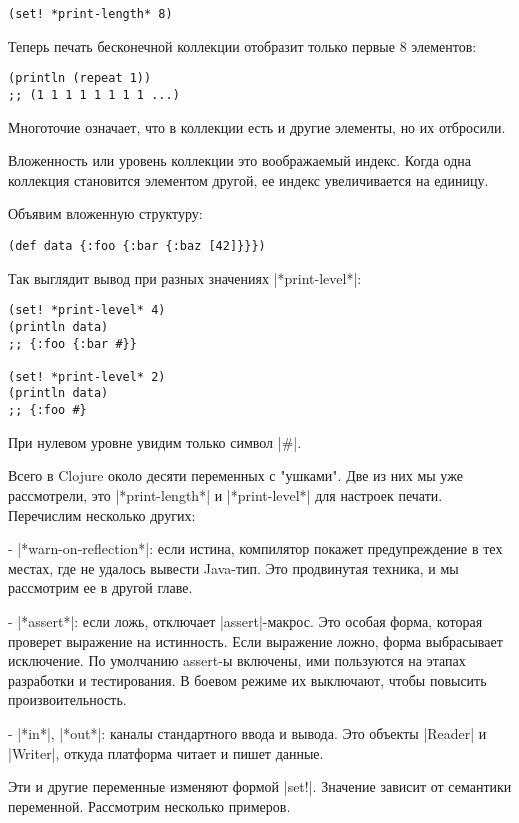 \begin{verbatim}
(set! *print-length* 8)
\end{verbatim}

Теперь печать бесконечной коллекции отобразит только первые 8 элементов:

\begin{verbatim}
(println (repeat 1))
;; (1 1 1 1 1 1 1 1 ...)
\end{verbatim}

Многоточие означает, что в коллекции есть и другие элементы, но их отбросили.

Вложенность или уровень коллекции это воображаемый индекс. Когда одна коллекция
становится элементом другой, ее индекс увеличивается на единицу.

Объявим вложенную структуру:

\begin{verbatim}
(def data {:foo {:bar {:baz [42]}}})
\end{verbatim}

Так выглядит вывод при разных значениях \spverb|*print-level*|:

\begin{verbatim}
(set! *print-level* 4)
(println data)
;; {:foo {:bar #}}

(set! *print-level* 2)
(println data)
;; {:foo #}
\end{verbatim}

При нулевом уровне увидим только символ \spverb|#|.

Всего в Clojure около десяти переменных с "ушками". Две из них мы уже
рассмотрели, это \spverb|*print-length*| и \spverb|*print-level*| для настроек
печати. Перечислим несколько других:

- \spverb|*warn-on-reflection*|: если истина, компилятор покажет предупреждение в тех
  местах, где не удалось вывести Java-тип. Это продвинутая техника, и мы
  рассмотрим ее в другой главе.

- \spverb|*assert*|: если ложь, отключает \spverb|assert|-макрос. Это особая форма, которая
  проверет выражение на истинность. Если выражение ложно, форма выбрасывает
  исключение. По умолчанию assert-ы включены, ими пользуются на этапах
  разработки и тестирования. В боевом режиме их выключают, чтобы повысить
  произвоительность.

- \spverb|*in*|, \spverb|*out*|: каналы стандартного ввода и вывода. Это объекты \spverb|Reader| и
  \spverb|Writer|, откуда платформа читает и пишет данные.

Эти и другие переменные изменяют формой \spverb|set!|. Значение зависит от семантики
переменной. Рассмотрим несколько примеров.

